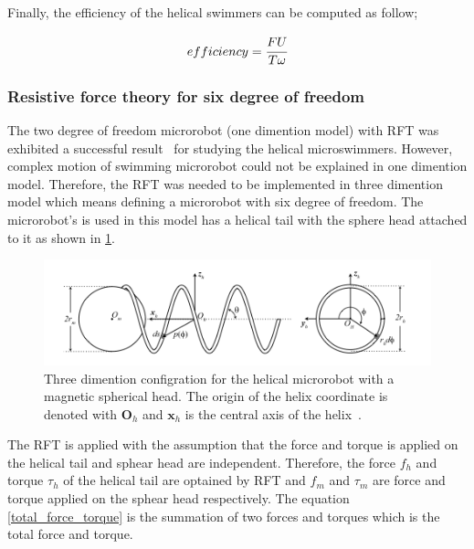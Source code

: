 \documentclass[12pt,a4paper,titlepage]{report}
\begin{document}
Finally, the efficiency of the helical swimmers can be computed as follow;



\begin{equation}
 efficiency = \cfrac{FU}{T \omega} 
\label{efficiency}
\end{equation}

 
\subsubsection{Resistive force theory for six degree of freedom}\label{RFT_sixDegree}
 



The two degree of freedom microrobot (one dimention model) with \ac*{RFT} was exhibited a successful result~\citep{mahoney2011velocity}
for studying the helical microswimmers. However, complex motion of swimming microrobot could not be 
explained in one dimention model. Therefore, the \ac*{RFT} was needed to be implemented in three dimention
model which means defining a microrobot with six degree of freedom. The microrobot\rq{}s is
used in this model has a helical tail with the sphere head attached to it as shown in \ref{RFT-6dof}.

\begin{figure}
  \centering
    \includegraphics[width=1.0\textwidth]{RFT-6dof}
  \caption[Helical microrobot configration with a magnetic spherical head]{Three dimention configration for the helical microrobot with a magnetic spherical head. The origin
of the helix coordinate is denoted with $\bm{O}_h$ and $\bm{x}_{h}$ is the central axis of the
 helix~\citep{mahoney2011velocity}.}
  \label{RFT-6dof}
\end{figure}

The \ac*{RFT} is applied with the assumption that the force and torque is applied on the helical tail and sphear
head are independent. Therefore, the force $f_h$ and torque $\tau_h$ of the helical tail are optained by \ac*{RFT} 
and $f_m$ and $\tau_m$ are force and torque applied on the sphear head respectively. 
The equation \ref{total_force_torque} is the summation of two forces and torques which is the total force and torque. 
\end{document}
